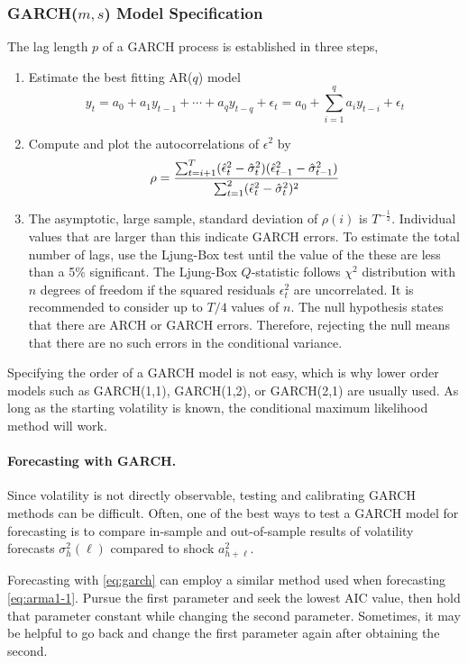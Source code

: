 \subsubsection{GARCH($m, s$) Model Specification}
The lag length $p$ of a GARCH process is established in three steps,
\begin{enumerate}
\item Estimate the best fitting AR($q$) model
\[
y_t = a_0 + a_1 y_{t-1} + \cdots + a_q y_{t-q} + \epsilon_t = a_0 + \sum_{i=1}^q a_i y_{t-i} + \epsilon_t 
\]
\item Compute and plot the autocorrelations of $\epsilon^2$ by 
\[
\rho = {{\sum^T_{t=i+1} (\hat \epsilon^2_t - \hat \sigma^2_t) (\hat \epsilon^2_{t-1} - \hat \sigma^2_{t-1})} \over {\sum^2_{t=1} (\hat \epsilon^2_t - \hat \sigma^2_t)^2}} 
\]
\item The asymptotic, large sample, standard deviation of $\rho(i)$ is $T^{-\frac{1}{2}}$. Individual values that are larger than this indicate GARCH errors. To estimate the total number of lags, use the Ljung-Box test until the value of the these are less than a 5\% significant. The Ljung-Box $Q$-statistic follows $\chi^2$ distribution with $n$ degrees of freedom if the squared residuals $\epsilon^2_t$  are uncorrelated. It is recommended to consider up to $T/4$ values of $n$. The null hypothesis states that there are ARCH or GARCH errors. Therefore, rejecting the null means that there are no such errors in the conditional variance.
\end{enumerate}

Specifying the order of a GARCH model is not easy, which is why lower order models such as GARCH(1,1), GARCH(1,2), or GARCH(2,1) are usually used. As long as the starting volatility is known, the conditional maximum likelihood method will work.

\paragraph{Forecasting with GARCH.}
Since volatility is not directly observable, testing and calibrating GARCH methods can be difficult. Often, one of the best ways to test a GARCH model for forecasting is to compare in-sample and out-of-sample results of volatility forecasts $\sigma^2_h(\ell)$ compared to shock $a^2_{h+\ell}$.

Forecasting with \eqref{eq:garch} can employ a similar method used when forecasting \eqref{eq:arma1-1}. Pursue the first parameter and seek the lowest AIC value, then hold that parameter constant while changing the second parameter. Sometimes, it may be helpful to go back and change the first parameter again after obtaining the second.

